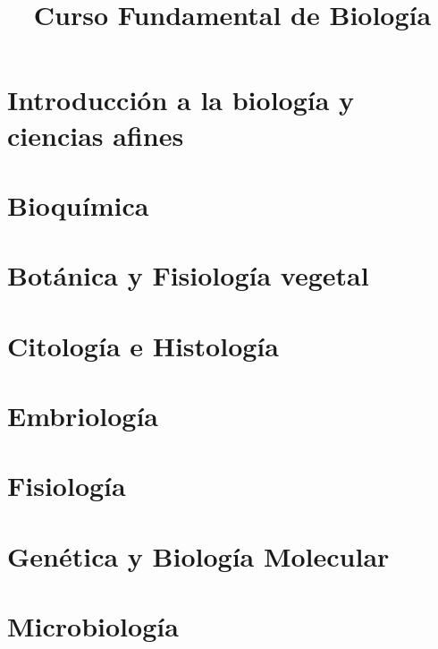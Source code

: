 \documentclass[a4paper, oneside, 10pt]{book}
\title{Curso Fundamental de Biología}
\begin{document}
    
    \clearpage
    \tableofcontents
    \clearpage
    \listoffigures
    \clearpage
    \listoftables
    \clearpage
    \listofEcuacion
    \clearpage
    \listofFormula
    \clearpage
    
    \part{Introducción a la biología y ciencias afines}
    
    \part{Bioquímica}
    
    
    \part{Botánica y Fisiología vegetal}
    \part{Citología e Histología}
    
    
    \part{Embriología}
    \part{Fisiología}
    \part{Genética y Biología Molecular}
    \part{Microbiología}
    
    
\end{document}
